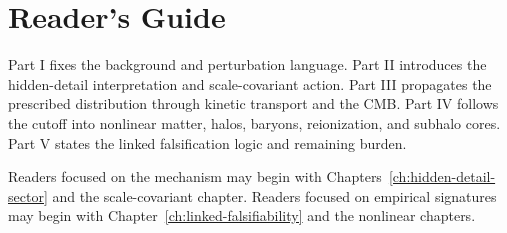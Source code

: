 \chapter*{Reader's Guide}
Part I fixes the background and perturbation language. Part II introduces the hidden-detail interpretation and scale-covariant action. Part III propagates the prescribed distribution through kinetic transport and the CMB. Part IV follows the cutoff into nonlinear matter, halos, baryons, reionization, and subhalo cores. Part V states the linked falsification logic and remaining burden.

Readers focused on the mechanism may begin with Chapters~\ref{ch:hidden-detail-sector} and the scale-covariant chapter. Readers focused on empirical signatures may begin with Chapter~\ref{ch:linked-falsifiability} and the nonlinear chapters.
